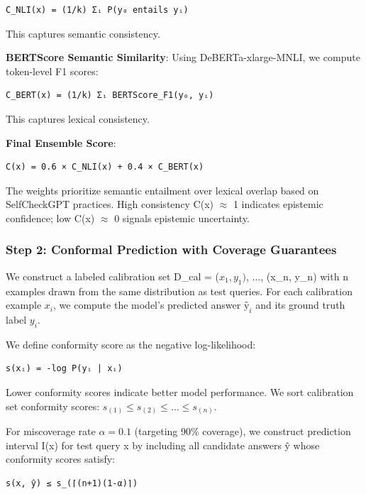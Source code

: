 \begin{verbatim}
C_NLI(x) = (1/k) Σᵢ P(y₀ entails yᵢ)
\end{verbatim}

This captures semantic consistency.

\textbf{BERTScore Semantic Similarity}: Using DeBERTa-xlarge-MNLI, we compute token-level F1 scores:

\begin{verbatim}
C_BERT(x) = (1/k) Σᵢ BERTScore_F1(y₀, yᵢ)
\end{verbatim}

This captures lexical consistency.

\textbf{Final Ensemble Score}:

\begin{verbatim}
C(x) = 0.6 × C_NLI(x) + 0.4 × C_BERT(x)
\end{verbatim}

The weights prioritize semantic entailment over lexical overlap based on SelfCheckGPT practices. High consistency C(x) $\approx$ 1 indicates epistemic confidence; low C(x) $\approx$ 0 signals epistemic uncertainty.

\subsubsection{Step 2: Conformal Prediction with Coverage Guarantees}

We construct a labeled calibration set D\_cal = {($x_1, y_{1})$, ..., (x\_n, y\_n)} with n examples drawn from the same distribution as test queries. For each calibration example $x_i$, we compute the model's predicted answer $ŷ_i$ and its ground truth label $y_i$.

We define conformity score as the negative log-likelihood:

\begin{verbatim}
s(xᵢ) = -log P(yᵢ | xᵢ)
\end{verbatim}

Lower conformity scores indicate better model performance. We sort calibration set conformity scores: $s_{(1)} \leq s_{(2)} \leq \ldots \leq s_{(n)}$.

For miscoverage rate $\alpha =0.1$ (targeting 90\% coverage), we construct prediction interval I(x) for test query x by including all candidate answers ŷ whose conformity scores satisfy:

\begin{verbatim}
s(x, ŷ) ≤ s_(⌈(n+1)(1-α)⌉)
\end{verbatim}

